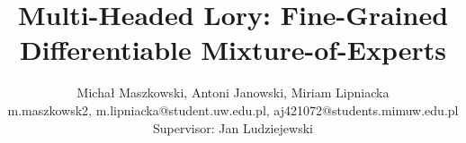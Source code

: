 \documentclass[12pt]{article}
\begin{document}
 
 
\title{Multi-Headed Lory: Fine-Grained Differentiable Mixture-of-Experts}%
\author{Michał Maszkowski, Antoni Janowski, Miriam Lipniacka\\ %
{m.maszkowsk2, m.lipniacka}@student.uw.edu.pl, aj421072@students.mimuw.edu.pl\\
Supervisor: Jan Ludziejewski}
\maketitle
\end{document}
